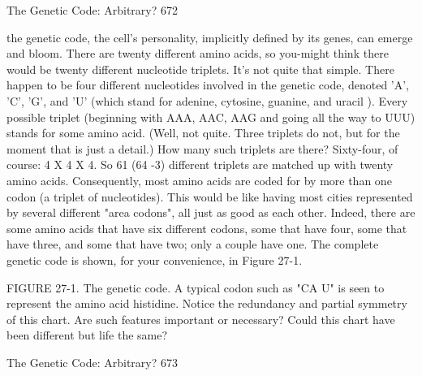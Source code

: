 The Genetic Code: Arbitrary?                                                         672

the genetic code, the cell's personality, implicitly defined by its genes, can emerge and
bloom.
         There are twenty different amino acids, so you-might think there would be
twenty different nucleotide triplets. It's not quite that simple. There happen to be four
different nucleotides involved in the genetic code, denoted 'A', 'C', 'G', and 'U' (which
stand for adenine, cytosine, guanine, and uracil ). Every possible triplet (beginning
with AAA, AAC, AAG and going all the way to UUU) stands for some amino acid.
(Well, not quite. Three triplets do not, but for the moment that is just a detail.) How
many such triplets are there? Sixty-four, of course: 4 X 4 X 4. So 61 (64 -3) different
triplets are matched up with twenty amino acids. Consequently, most amino acids are
coded for by more than one codon (a triplet of nucleotides). This would be like having
most cities represented by several different "area codons", all just as good as each
other. Indeed, there are some amino acids that have six different codons, some that
have four, some that have three, and some that have two; only a couple have one. The
complete genetic code is shown, for your convenience, in Figure 27-1.

        FIGURE 27-1. The genetic code. A typical codon such as "CA U" is seen to
represent the amino acid histidine. Notice the redundancy and partial symmetry of
this chart. Are such features important or necessary? Could this chart have been
different but life the same?




The Genetic Code: Arbitrary?                                                         673

